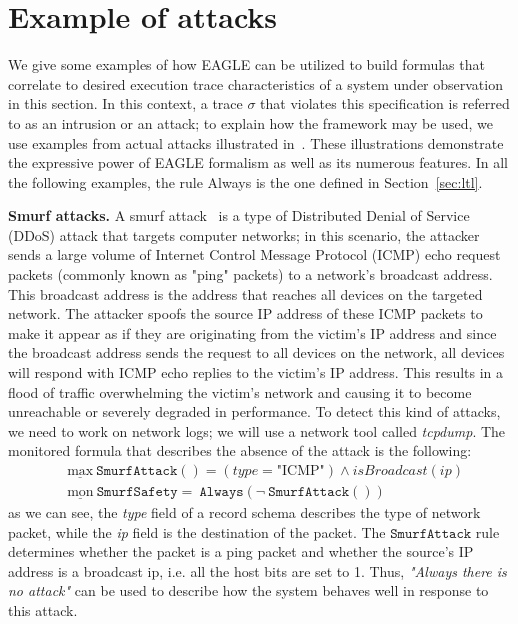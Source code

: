\documentclass[english]{article}
\begin{document}
\section{Example of attacks}\label{attacks}
We give some examples of how EAGLE can be utilized to build formulas that correlate to desired execution trace characteristics of a system under observation in this section. In this context, a trace $\sigma$ that violates this specification is referred to as an intrusion or an attack; to explain how the framework may be used, we use examples from actual attacks illustrated in~\cite{naldurg2004temporal}. These illustrations demonstrate the expressive power of EAGLE formalism as well as its numerous features. In all the following examples, the rule Always is the one defined in Section~\ref{sec:ltl}.

\textbf{Smurf attacks.}
A smurf attack~\cite{zargar2009identification} is a type of Distributed Denial of Service (DDoS) attack that targets computer networks; in this scenario, the attacker sends a large volume of Internet Control Message Protocol (ICMP) echo request packets (commonly known as "ping" packets) to a network's broadcast address. This broadcast address is the address that reaches all devices on the targeted network. The attacker spoofs the source IP address of these ICMP packets to make it appear as if they are originating from the victim's IP address and since the broadcast address sends the request to all devices on the network, all devices will respond with ICMP echo replies to the victim's IP address. This results in a flood of traffic overwhelming the victim's network and causing it to become unreachable or severely degraded in performance. To detect this kind of attacks, we need to work on network logs; we will use a network tool called \textit{tcpdump}. The monitored formula that describes the absence of the attack is the following:
\begin{align*}
    & \underline{\text{max}}\ \mathtt{SmurfAttack()} = (type = \text{"ICMP"})\land isBroadcast(ip) \\
    & \underline{\text{mon}}\ \mathtt{SmurfSafety} =\ \mathtt{Always}(\neg\ \mathtt{SmurfAttack()}) 
\end{align*}
as we can see, the \textit{type} field of a record schema describes the type of network packet, while the \textit{ip} field is the destination of the packet. The $\mathtt{SmurfAttack}$ rule determines whether the packet is a ping packet and whether the source's IP address is a broadcast ip, i.e. all the host bits are set to 1. Thus, \textit{"Always there is no attack"} can be used to describe how the system behaves well in response to this attack.
\end{document}

